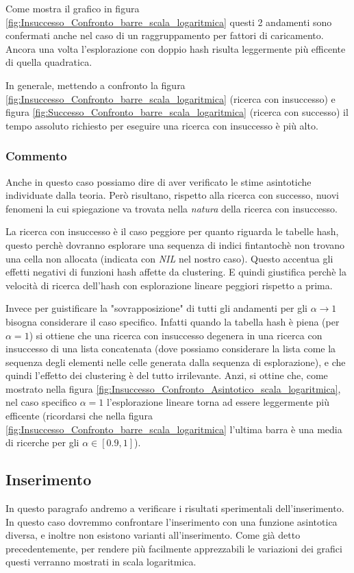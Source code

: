 \documentclass{article}
\begin{document}
Come mostra il grafico in figura \ref{fig:Insuccesso_Confronto_barre_scala_logaritmica} questi 2 andamenti sono confermati anche nel caso di un raggruppamento per fattori di caricamento. Ancora una volta l'esplorazione con doppio hash risulta leggermente più efficente di quella quadratica.

In generale, mettendo a confronto la figura \ref{fig:Insuccesso_Confronto_barre_scala_logaritmica} (ricerca con insuccesso) e figura \ref{fig:Successo_Confronto_barre_scala_logaritmica} (ricerca con successo) il tempo assoluto richiesto per eseguire una ricerca con insuccesso è più alto.

\subsubsection{Commento}
Anche in questo caso possiamo dire di aver verificato le stime asintotiche individuate dalla teoria. Però risultano, rispetto alla ricerca con successo, nuovi fenomeni la cui spiegazione va trovata nella \emph{natura} della ricerca con insuccesso.

La ricerca con insuccesso è il caso peggiore per quanto riguarda le tabelle hash, questo perchè dovranno esplorare una sequenza di indici fintantochè non trovano una cella non allocata (indicata con \emph{NIL} nel nostro caso). Questo accentua gli effetti negativi di funzioni hash affette da clustering. E quindi giustifica perchè la velocità di ricerca dell'hash con esplorazione lineare peggiori rispetto a prima.

Invece per guistificare la "sovrapposizione" di tutti gli andamenti per gli $\alpha \longrightarrow 1$ bisogna considerare il caso specifico. Infatti quando la tabella hash è piena (per $\alpha = 1$) si ottiene che una ricerca con insuccesso degenera in una ricerca con insuccesso di una lista concatenata (dove possiamo considerare la lista come la sequenza degli elementi nelle celle generata dalla sequenza di esplorazione), e che quindi l'effetto dei clustering è del tutto irrilevante. Anzi, si ottine che, come mostrato nella figura \ref{fig:Insuccesso_Confronto_Asintotico_scala_logaritmica}, nel caso specifico $\alpha = 1$ l'esplorazione lineare torna ad essere leggermente più efficente (ricordarsi che nella figura \ref{fig:Insuccesso_Confronto_barre_scala_logaritmica} l'ultima barra è una media di ricerche per gli $\alpha \in [0.9, 1]$).

\subsection{Inserimento}
In questo paragrafo andremo a verificare i risultati sperimentali dell'inserimento. In questo caso dovremmo confrontare l'inserimento con una funzione asintotica diversa, e inoltre non esistono varianti all'inserimento. Come già detto precedentemente, per rendere più facilmente apprezzabili le variazioni dei grafici questi verranno mostrati in scala logaritmica.
\end{document}
